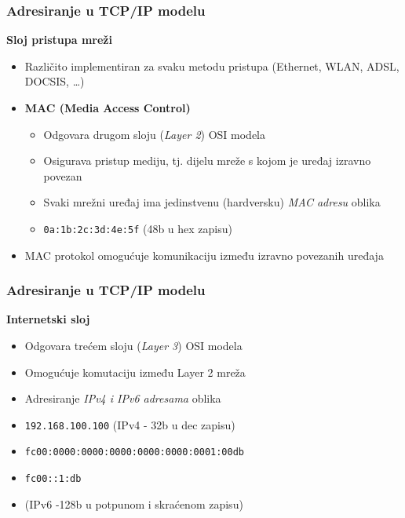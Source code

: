\documentclass[t,table,usenames,dvipsnames]{beamer}
\begin{document}
\begin{frame}
	\frametitle{Adresiranje u TCP/IP modelu}
	\textbf{Sloj pristupa mreži}
	\begin{itemize}
		\item Različito implementiran za svaku metodu pristupa (Ethernet, WLAN, ADSL, DOCSIS, \dots)
	\end{itemize}
	\vfill
	\begin{itemize}
		\item \textbf{MAC (Media Access Control)}
		\begin{itemize}
			\item Odgovara drugom sloju (\textit{Layer 2}) OSI modela
			\item Osigurava pristup mediju, tj. dijelu mreže s kojom je uređaj izravno povezan
			\item Svaki mrežni uređaj ima jedinstvenu (hardversku) \emph{MAC adresu} oblika
			\item[] \texttt{0a:1b:2c:3d:4e:5f} \hfill (48b u hex zapisu) \hfill \,
		\end{itemize}
		\item MAC protokol omogućuje komunikaciju između izravno povezanih uređaja
	\end{itemize}
\end{frame}

\begin{frame}
	\frametitle{Adresiranje u TCP/IP modelu}
	\textbf{Internetski sloj}
	\begin{itemize}
		\item Odgovara trećem sloju (\textit{Layer 3}) OSI modela
		\item Omogućuje komutaciju između Layer 2 mreža
		\item Adresiranje \emph{IPv4 i IPv6 adresama} oblika
		\item[] \texttt{192.168.100.100} \hfill (IPv4 - 32b u dec zapisu)
		\item[] \texttt{fc00:0000:0000:0000:0000:0000:0001:00db}
		\item[] \texttt{fc00::1:db}
		\item[] \hfill (IPv6 -128b u potpunom i skraćenom zapisu)
	\end{itemize}
\end{frame}
\end{document}
